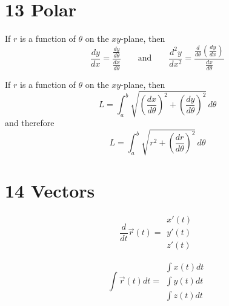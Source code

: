 \section*{13 Polar}

\begin{theorem} If $r$ is a function of $\theta$ on the $xy$-plane, then
  \[
    \frac{dy}{dx} = \frac{\frac{dy}{d\theta}}{\frac{dx}{d\theta}}
    \qquad \text{and} \qquad
    \frac{d^2 y}{d x^2} = \frac{\frac{d}{d\theta} \left(\frac{dy}{dx}\right)}{\frac{dx}{d\theta}}
  \]
\end{theorem}

\begin{theorem} If $r$ is a function of $\theta$ on the $xy$-plane, then
  \[
    L = \int_a^b \sqrt{\left(\frac{dx}{d\theta}\right)^2 + \left(\frac{dy}{d\theta}\right)^2} \,d\theta
  \]
  and therefore
  \[
    L = \int_a^b \sqrt{r^2 + \left(\frac{dr}{d\theta}\right)^2} \,d\theta
  \]
\end{theorem}

\section*{14 Vectors}

\[
  \frac{d}{dt} \vec{r}(t) = \begin{matrix}
    x'(t) \\
    y'(t) \\
    z'(t)
  \end{matrix}
\]

\[
  \int \vec{r}(t) dt = \begin{matrix}
    \int x(t) dt \\
    \int y(t) dt \\
    \int z(t) dt
  \end{matrix}
\]

